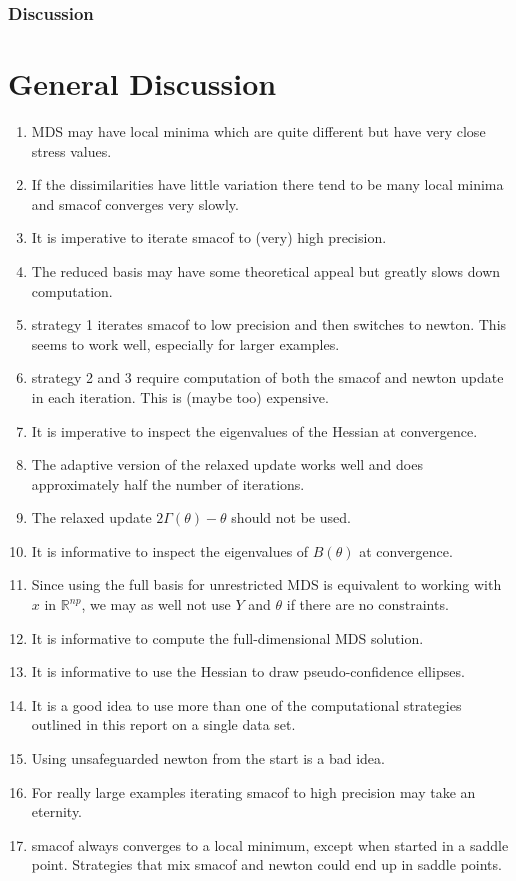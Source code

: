 \documentclass[
  12pt,
]{article}
\providecommand{\tightlist}{%
  \setlength{\itemsep}{0pt}\setlength{\parskip}{0pt}}
\begin{document}
\subsubsection{Discussion}\label{discussion-7}

\section{General Discussion}\label{general-discussion}

\begin{enumerate}
\def\labelenumi{\arabic{enumi}.}
\tightlist
\item
  MDS may have local minima which are quite different but have very close stress values.
\item
  If the dissimilarities have little variation there tend to be many local minima and
  smacof converges very slowly.
\item
  It is imperative to iterate smacof to (very) high precision.
\item
  The reduced basis may have some theoretical appeal but greatly slows down computation.
\item
  strategy 1 iterates smacof to low precision and then switches to newton. This seems to work
  well, especially for larger examples.
\item
  strategy 2 and 3 require computation of both the smacof and newton update in each iteration.
  This is (maybe too) expensive.
\item
  It is imperative to inspect the eigenvalues of the Hessian at convergence.
\item
  The adaptive version of the relaxed update works well and does approximately
  half the number of iterations.
\item
  The relaxed update \(2\Gamma(\theta)-\theta\) should not be used.
\item
  It is informative to inspect the eigenvalues of \(B(\theta)\) at convergence.
\item
  Since using the full basis for unrestricted MDS is equivalent to
  working with \(x\) in \(\mathbb{R}^{np}\), we may as well not use \(Y\) and \(\theta\)
  if there are no constraints.
\item
  It is informative to compute the full-dimensional MDS solution.
\item
  It is informative to use the Hessian to draw pseudo-confidence ellipses.
\item
  It is a good idea to use more than one of the computational strategies
  outlined in this report on a single data set.
\item
  Using unsafeguarded newton from the start is a bad idea.
\item
  For really large examples iterating smacof to high precision may take
  an eternity.
\item
  smacof always converges to a local minimum, except when started in a
  saddle point. Strategies that mix smacof and newton could end up in
  saddle points.
\end{enumerate}
\end{document}

